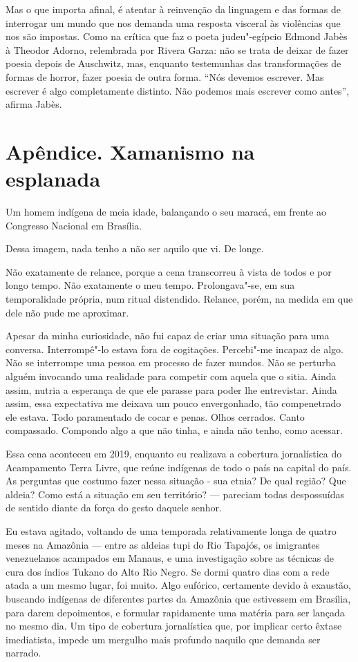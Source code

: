 Mas o que importa afinal, é atentar à reinvenção da linguagem e das
formas de interrogar um mundo que nos demanda uma resposta visceral às
violências que nos são impostas. Como na crítica que faz o poeta
judeu"-egípcio Edmond Jabès à Theodor Adorno, relembrada por Rivera
Garza: não se trata de deixar de fazer poesia depois de Auschwitz, mas,
enquanto testemunhas das transformações de formas de horror, fazer
poesia de outra forma. ``Nós devemos escrever. Mas escrever é algo
completamente distinto. Não podemos mais escrever como antes'', afirma
Jabès.

\chapter{Apêndice. Xamanismo na esplanada}

Um homem indígena de meia idade, balançando o seu maracá, em frente ao
Congresso Nacional em Brasília.

Dessa imagem, nada tenho a não ser aquilo que vi. De longe.

Não exatamente de relance, porque a cena transcorreu à vista de todos e
por longo tempo. Não exatamente o meu tempo. Prolongava"-se, em sua
temporalidade própria, num ritual distendido. Relance, porém, na medida
em que dele não pude me aproximar.

Apesar da minha curiosidade, não fui capaz de criar uma situação para
uma conversa. Interrompê"-lo estava fora de cogitações. Percebi"-me
incapaz de algo. Não se interrompe uma pessoa em processo de fazer
mundos. Não se perturba alguém invocando uma realidade para competir com
aquela que o sitia. Ainda assim, nutria a esperança de que ele parasse
para poder lhe entrevistar. Ainda assim, essa expectativa me deixava um
pouco envergonhado, tão compenetrado ele estava. Todo paramentado de
cocar e penas. Olhos cerrados. Canto compassado. Compondo algo a que não
tinha, e ainda não tenho, como acessar.

Essa cena aconteceu em 2019, enquanto eu realizava a cobertura
jornalística do Acampamento Terra Livre, que reúne indígenas de todo o
país na capital do país. As perguntas que costumo fazer nessa situação -
sua etnia? De qual região? Que aldeia? Como está a situação em seu
território? --- pareciam todas despossuídas de sentido diante da força do
gesto daquele senhor.

Eu estava agitado, voltando de uma temporada relativamente longa de
quatro meses na Amazônia --- entre as aldeias tupi do Rio Tapajós, os
imigrantes venezuelanos acampados em Manaus, e uma investigação sobre as
técnicas de cura dos índios Tukano do Alto Rio Negro. Se dormi quatro
dias com a rede atada a um mesmo lugar, foi muito. Algo eufórico,
certamente devido à exaustão, buscando indígenas de diferentes partes da
Amazônia que estivessem em Brasília, para darem depoimentos, e formular
rapidamente uma matéria para ser lançada no mesmo dia. Um tipo de
cobertura jornalística que, por implicar certo êxtase imediatista,
impede um mergulho mais profundo naquilo que demanda ser narrado.

